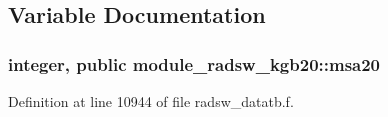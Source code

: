 \subsection{Variable Documentation}
\subsubsection[{\texorpdfstring{msa20}{msa20}}]{\setlength{\rightskip}{0pt plus 5cm}integer, public module\+\_\+radsw\+\_\+kgb20\+::msa20}\hypertarget{namespacemodule__radsw__kgb20_aadf199a3d453192a891b575d9adf8608}{}\label{namespacemodule__radsw__kgb20_aadf199a3d453192a891b575d9adf8608}


Definition at line 10944 of file radsw\+\_\+datatb.\+f.

